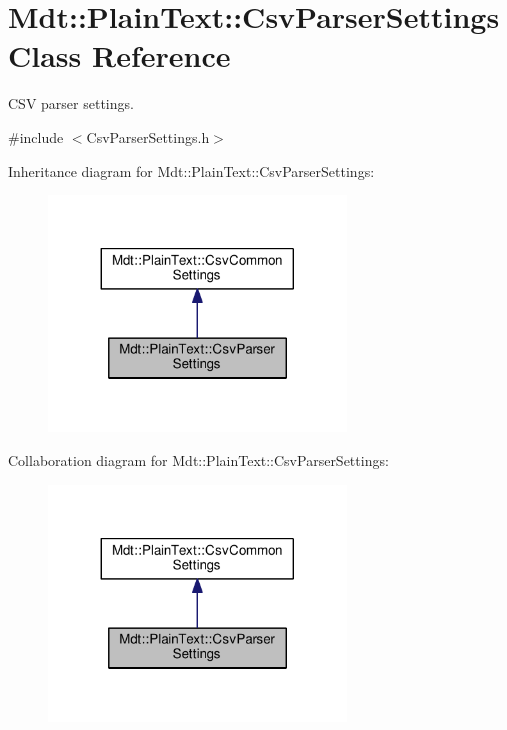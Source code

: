 \hypertarget{class_mdt_1_1_plain_text_1_1_csv_parser_settings}{}\section{Mdt\+:\+:Plain\+Text\+:\+:Csv\+Parser\+Settings Class Reference}
\label{class_mdt_1_1_plain_text_1_1_csv_parser_settings}


C\+SV parser settings.  




{\ttfamily \#include $<$Csv\+Parser\+Settings.\+h$>$}



Inheritance diagram for Mdt\+:\+:Plain\+Text\+:\+:Csv\+Parser\+Settings\+:\nopagebreak
\begin{figure}[H]
\begin{center}
\leavevmode
\includegraphics[width=224pt]{class_mdt_1_1_plain_text_1_1_csv_parser_settings__inherit__graph}
\end{center}
\end{figure}


Collaboration diagram for Mdt\+:\+:Plain\+Text\+:\+:Csv\+Parser\+Settings\+:\nopagebreak
\begin{figure}[H]
\begin{center}
\leavevmode
\includegraphics[width=224pt]{class_mdt_1_1_plain_text_1_1_csv_parser_settings__coll__graph}
\end{center}
\end{figure}
